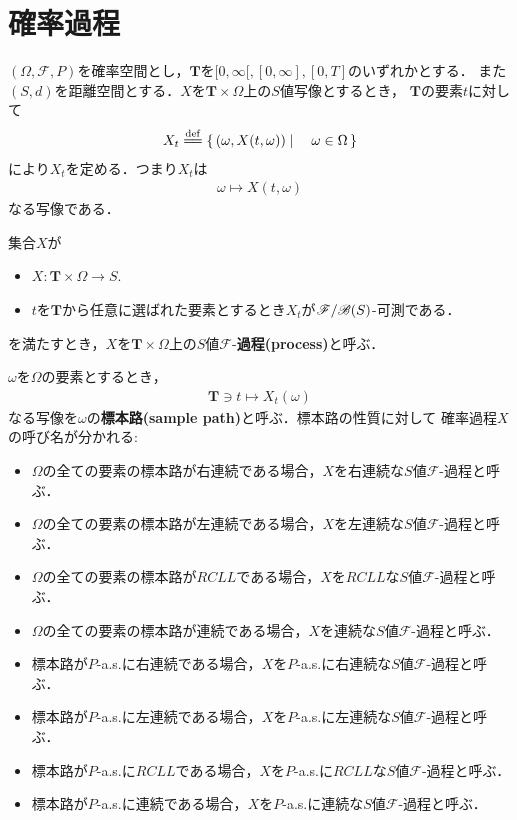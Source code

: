 \section{確率過程}
	$(\Omega,\mathscr{F},P)$を確率空間とし，$\mathbf{T}$を$[0,\infty[,[0,\infty],[0,T]$のいずれかとする．
	また$(S,d)$を距離空間とする．$X$を$\mathbf{T} \times \Omega$上の$S$値写像とするとき，
	$\mathbf{T}$の要素$t$に対して
	\begin{align}
		X_t \defeq \Set{(\omega,X(t,\omega))}{\omega \in \Omega}
	\end{align}
	により$X_t$を定める．つまり$X_t$は
	\begin{align}
		\omega \longmapsto X(t,\omega)
	\end{align}
	なる写像である．
	
	\begin{screen}
		\begin{dfn}[確率過程]
			集合$X$が
			\begin{itemize}
				\item $X:\mathbf{T} \times \Omega \longrightarrow S$.
				\item $t$を$\mathbf{T}$から任意に選ばれた要素とするとき$X_t$が$\mathscr{F}/\mathscr{B}(S)$-可測である．
			\end{itemize}
			を満たすとき，$X$を$\mathbf{T} \times \Omega$上の$S$値$\mathscr{F}$-{\bf 過程}{\bf (process)}と呼ぶ．
		\end{dfn}
	\end{screen}
	
	$\omega$を$\Omega$の要素とするとき，
	\begin{align}
		\mathbf{T} \ni t \longmapsto X_t(\omega)
	\end{align}
	なる写像を$\omega$の{\bf 標本路}{\bf (sample path)}と呼ぶ．標本路の性質に対して
	確率過程$X$の呼び名が分かれる:
	\begin{itemize}
		\item $\Omega$の全ての要素の標本路が右連続である場合，$X$を右連続な$S$値$\mathscr{F}$-過程と呼ぶ．
		\item $\Omega$の全ての要素の標本路が左連続である場合，$X$を左連続な$S$値$\mathscr{F}$-過程と呼ぶ．
		\item $\Omega$の全ての要素の標本路が$RCLL$である場合，$X$を$RCLL$な$S$値$\mathscr{F}$-過程と呼ぶ．
		\item $\Omega$の全ての要素の標本路が連続である場合，$X$を連続な$S$値$\mathscr{F}$-過程と呼ぶ．
		\item 標本路が$P$-a.s.に右連続である場合，$X$を$P$-a.s.に右連続な$S$値$\mathscr{F}$-過程と呼ぶ．
		\item 標本路が$P$-a.s.に左連続である場合，$X$を$P$-a.s.に左連続な$S$値$\mathscr{F}$-過程と呼ぶ．
		\item 標本路が$P$-a.s.に$RCLL$である場合，$X$を$P$-a.s.に$RCLL$な$S$値$\mathscr{F}$-過程と呼ぶ．
		\item 標本路が$P$-a.s.に連続である場合，$X$を$P$-a.s.に連続な$S$値$\mathscr{F}$-過程と呼ぶ．
	\end{itemize}
	
